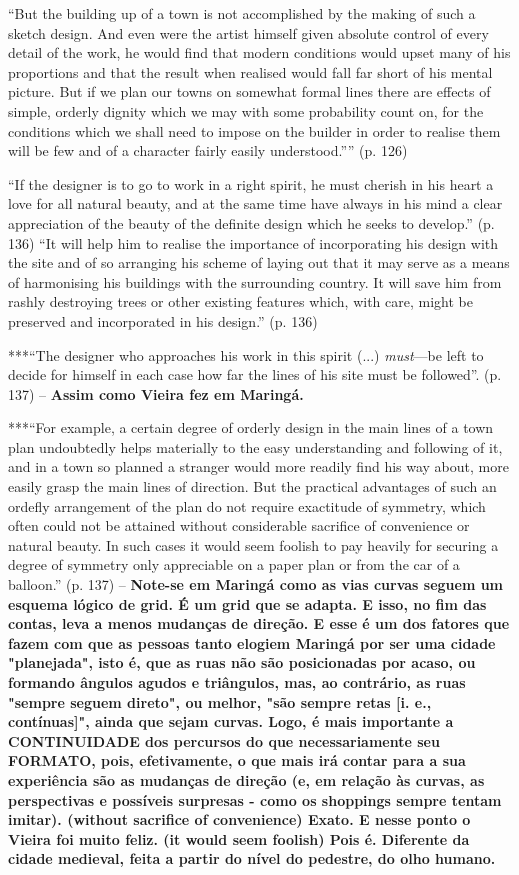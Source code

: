\documentclass[12pt, a4paper]{book} %
\begin{document}
        ``But the building up of a town is not accomplished by the making of such a sketch design. And even were the artist himself given absolute control of every detail of the work, he would find that modern conditions would upset many of his proportions and that the result when realised would fall far short of his mental picture. But if we plan our towns on somewhat formal lines there are effects of simple, orderly dignity which we may with some probability count on, for the conditions which we shall need to impose on the builder in order to realise them will be few and of a character fairly easily understood.'''' (p. 126)

        ``If the designer is to go to work in a right spirit, he must cherish in his heart a love for all natural beauty, and at the same time have always in his mind a clear appreciation of the beauty of the definite design which he seeks to develop.'' (p. 136)
        ``It will help him to realise the importance of incorporating his design with the site and of so arranging his scheme of laying out that it may serve as a means of harmonising his buildings with the surrounding country. It will save him from rashly destroying trees or other existing features which, with care, might be preserved and incorporated in his design.'' (p. 136)

        ***``The designer who approaches his work in this spirit (...) \textit{must}—be left to decide for himself in each case how far the lines of his site must be followed''. (p. 137) – \textbf{Assim como Vieira fez em Maringá.}

        ***``For example, a certain degree of orderly design in the main lines of a town plan undoubtedly helps materially to the easy understanding and following of it, and in a town so planned a stranger would more readily find his way about, more easily grasp the main lines of direction. But the practical advantages of such an ordefly arrangement of the plan do not require exactitude of symmetry, which often could not be attained without considerable sacrifice of convenience or natural beauty. In such cases it would seem foolish to pay heavily for securing a degree of symmetry only appreciable on a paper plan or from the car of a balloon.'' (p. 137) – \textbf{Note-se em Maringá como as vias curvas seguem um esquema lógico de grid. É um grid que se adapta. E isso, no fim das contas, leva a menos mudanças de direção. E esse é um dos fatores que fazem com que as pessoas tanto elogiem Maringá por ser uma cidade "planejada", isto é, que as ruas não são posicionadas por acaso, ou formando ângulos agudos e triângulos, mas, ao contrário, as ruas "sempre seguem direto", ou melhor, "são sempre retas [i. e., contínuas]", ainda que sejam curvas. 
        Logo, é mais importante a CONTINUIDADE dos percursos do que necessariamente seu FORMATO, pois, efetivamente, o que mais irá contar para a sua experiência são as mudanças de direção (e, em relação às curvas, as perspectivas e possíveis surpresas - como os shoppings sempre tentam imitar).
        (without sacrifice of convenience) Exato. E nesse ponto o Vieira foi muito feliz. (it would seem foolish) Pois é. Diferente da cidade medieval, feita a partir do nível do pedestre, do olho humano.}
\end{document}
